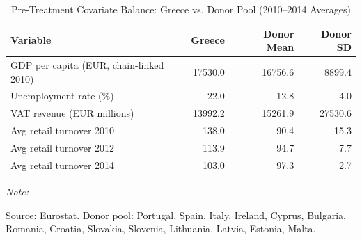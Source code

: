 \begin{table}[!h]
\centering
\caption{\label{tab:tab6}Pre-Treatment Covariate Balance: Greece vs. Donor Pool (2010--2014 Averages)}
\centering
\begin{threeparttable}
\begin{tabular}[t]{lrrr}
\toprule
Variable & Greece & Donor Mean & Donor SD\\
\midrule
GDP per capita (EUR, chain-linked 2010) & 17530.0 & 16756.6 & 8899.4\\
Unemployment rate (\%) & 22.0 & 12.8 & 4.0\\
VAT revenue (EUR millions) & 13992.2 & 15261.9 & 27530.6\\
Avg retail turnover 2010 & 138.0 & 90.4 & 15.3\\
Avg retail turnover 2012 & 113.9 & 94.7 & 7.7\\
\addlinespace
Avg retail turnover 2014 & 103.0 & 97.3 & 2.7\\
\bottomrule
\end{tabular}
\begin{tablenotes}
\item \textit{Note: } 
\item Source: Eurostat. Donor pool: Portugal, Spain, Italy, Ireland, Cyprus, Bulgaria, Romania, Croatia, Slovakia, Slovenia, Lithuania, Latvia, Estonia, Malta.
\end{tablenotes}
\end{threeparttable}
\end{table}
